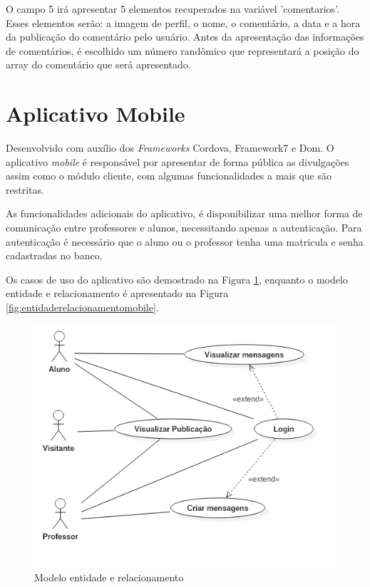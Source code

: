 O campo 5 irá apresentar 5 elementos recuperados na variável 'comentarios'. Esses elementos serão: a imagem de perfil, o nome, o comentário, a data e a hora da publicação do comentário pelo usuário. Antes da apresentação das informações de comentários, é escolhido um número randômico que representará a posição do array do comentário que será apresentado.

\section{Aplicativo Mobile}
Desenvolvido com auxílio dos \textit{Frameworks} Cordova, Framework7 e Dom. O aplicativo \textit{mobile} é responsável por apresentar de forma pública as divulgações assim como o módulo cliente, com algumas funcionalidades a mais que são restritas.

As funcionalidades adicionais do aplicativo, é disponibilizar uma melhor forma de comunicação entre professores e alunos, necessitando apenas a autenticação. Para autenticação é necessário que o aluno ou o professor tenha uma matricula e senha cadastradas no banco.

Os casos de uso do aplicativo são demostrado na Figura \ref{fig:casosdeusomobile}, enquanto o modelo entidade e relacionamento é apresentado na Figura \ref{fig:entidaderelacionamentomobile}.
\begin{figure}[H]
\centering
\includegraphics[scale=0.4]{figuras/CasosDeUsoMobile}
\caption{Modelo entidade e relacionamento}
\label{fig:casosdeusomobile}
\end{figure}

